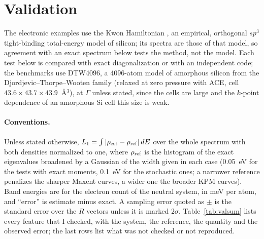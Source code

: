 \documentclass[reprint,nofootinbib,superscriptaddress,amsmath,amssymb,aps,prb,floatfix]{revtex4-2}
\begin{document}
\section{Validation}
\label{sec:validation}

The electronic examples use the Kwon Hamiltonian \cite{kwon}, an empirical, orthogonal $sp^3$ tight-binding total-energy model of silicon; its spectra are those of that model, so agreement with an exact spectrum below tests the method, not the model. Each test below is compared with exact diagonalization or with an independent code; the benchmarks use DTW4096, a 4096-atom model of amorphous silicon from the Djordjevic--Thorpe--Wooten family \cite{www,dtw} (relaxed at zero pressure with ACE, cell $43.6\times43.7\times43.9$~\AA$^3$), at $\Gamma$ unless stated, since the cells are large and the $k$-point dependence of an amorphous Si cell this size is weak.

\paragraph*{Conventions.}
Unless stated otherwise, $L_1=\int|\rho_{\rm est}-\rho_{\rm ref}|\,dE$ over the whole spectrum with both densities normalized to one, where $\rho_{\rm ref}$ is the histogram of the exact eigenvalues broadened by a Gaussian of the width given in each case (0.05~eV for the tests with exact moments, 0.1~eV for the stochastic ones; a narrower reference penalizes the sharper Maxent curves, a wider one the broader KPM curves). Band energies are for the electron count of the neutral system, in meV per atom, and ``error'' is estimate minus exact. A sampling error quoted as $\pm$ is the standard error over the $R$ vectors unless it is marked $2\sigma$.
Table~\ref{tab:valsum} lists every feature that I checked, with the system, the reference, the quantity and the observed error; the last rows list what was not checked or not reproduced.
\end{document}
